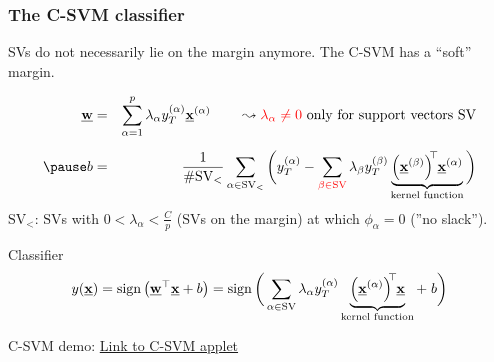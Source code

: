 \begin{frame}\frametitle{The C-SVM classifier}

SVs do not necessarily lie on the margin anymore. The C-SVM has a ``soft'' margin.

\slidesonly{\vspace{-3mm}}

	\begin{eqnarray*}
		\vec{w} &=& \sum\limits_{\alpha = 1}^p \lambda_\alpha y_T^{(\alpha)}
			\vec{x}^{(\alpha)} \qquad
		\leadsto {\color{red}\lambda_\alpha \neq 0} \text{ only for support vectors }\mathrm{SV}\\[2mm]
		\pause
		b &=& \frac{1}{\# \mathrm{SV}_<} \sum\limits_{\alpha \in \mathrm{SV}_<} \bigg( y_T^{(\alpha)}
			- \sum\limits_{\color{red}\beta \in \mathrm{SV}} \lambda_\beta y_T^{(\beta)} 
			\underbrace{ \Big( \vec{x}^{(\beta)} \Big)^{\kern-0.6ex\top} 
				\kern-0.2ex\vec{x}^{(\alpha)}}_{\text{kernel function}}
			\bigg)
	\end{eqnarray*}
	\vspace{2mm}
	$\mathrm{SV}_<$: $\mathrm{SV}$s with $0 < \lambda_\alpha < \frac{C}{p}$ 
	($\mathrm{SV}$s on the margin) at which $\phi_\alpha = 0$ (''no slack'').
	
	
	\pause

	\begin{block}{Classifier}
	\begin{equation*}
		y(\underline{\mathbf{x}}) = \operatorname{sign} \big( \underline{\mathbf{w}}^\top \underline{\mathbf{x}} + b \big) 
		= \operatorname{sign} \bigg( \sum\limits_{\alpha \in \mathrm{SV}} \lambda_\alpha y_T^{(\alpha)} 
			\underbrace{ \Big( \underline{\mathbf{x}}^{(\alpha)} \Big)^{\kern-0.6ex\top} 
				\kern-0.2ex \underline{\mathbf{x}}}_{
				\text{kernel function}} + \;b
			\bigg)
	\end{equation*}
	\end{block}
\end{frame}

\begin{frame}
C-SVM demo: \href{https://cs.stanford.edu/people/karpathy/svmjs/demo/}{Link to C-SVM applet}
\end{frame}
